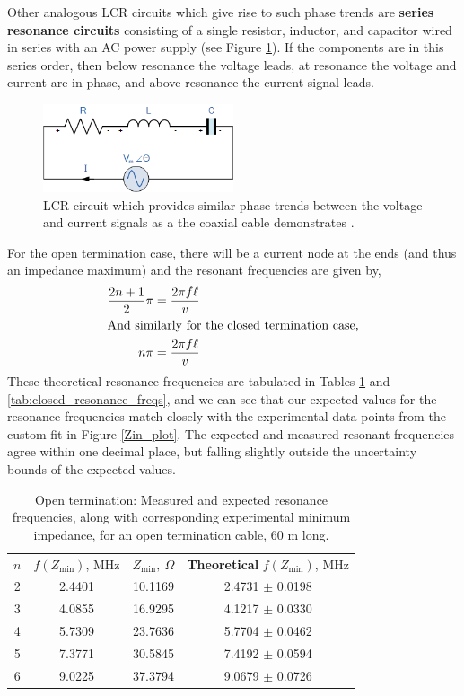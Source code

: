 Other analogous LCR circuits which give rise to such phase trends are \textbf{series resonance circuits} consisting of a single resistor, inductor, and capacitor wired in series with an AC power supply (see Figure \ref{fig:lrc_circuit}). If the components are in this series order, then below resonance the voltage leads, at resonance the voltage and current are in phase, and above resonance the current signal leads.\\

\begin{figure}[H]
    \centering
    \includegraphics[width=0.5\textwidth]{figures/acp200.png}
    \caption{LCR circuit which provides similar phase trends between the voltage and current signals as a the coaxial cable demonstrates \cite{lrc}.}
    \label{fig:lrc_circuit}
\end{figure}

\vspace{5mm}

For the open termination case, there will be a current node at the ends (and thus an impedance maximum) and the resonant frequencies are given by,
\begin{align}
    \frac{2n+1}{2} \pi &= \frac{2\pi f \ell}{v} \\
    \intertext{And similarly for the closed termination case,}
    n\pi &= \frac{2\pi f \ell}{v}
\end{align}
These theoretical resonance frequencies are tabulated in Tables \ref{tab:open_resonance_freqs} and \ref{tab:closed_resonance_freqs}, and we can see that our expected values for the resonance frequencies match closely with the experimental data points from the custom fit in Figure \ref{Zin_plot}. The expected and measured resonant frequencies agree within one decimal place, but falling slightly outside the uncertainty bounds of the expected values.
\begin{table}[H]
    \centering
    \begin{tabular}{c|c|c|c}
        $n$ & $f(Z_\text{min})$, MHz &  $Z_\text{min}, \ \Omega$ & \textbf{Theoretical} $f(Z_\text{min})$, MHz \\
        2 & 2.4401 & 10.1169 & 2.4731 $\pm$ 0.0198\\
        3 & 4.0855 & 16.9295 & 4.1217 $\pm$ 0.0330\\
        4 & 5.7309 & 23.7636 & 5.7704 $\pm$ 0.0462\\
        5 & 7.3771 & 30.5845 & 7.4192 $\pm$ 0.0594\\
        6 & 9.0225 & 37.3794 & 9.0679 $\pm$ 0.0726\\
    \end{tabular}
    \caption{Open termination: Measured and expected resonance frequencies, along with corresponding experimental minimum impedance, for an open termination cable, 60 m long.}
    \label{tab:open_resonance_freqs}
\end{table}


